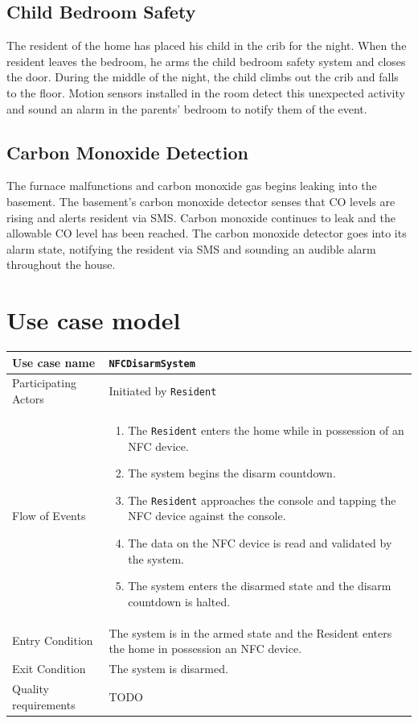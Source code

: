 \documentclass{report}
\begin{document}
\subsection*{Child Bedroom Safety}

The resident of the home has placed his child in the crib for the night. When
the resident leaves the bedroom, he arms the child bedroom safety system and
closes the door. During the middle of the night, the child climbs out the crib
and falls to the floor. Motion sensors installed in the room detect this
unexpected activity and sound an alarm in the parents' bedroom to notify them
of the event.

\subsection*{Carbon Monoxide Detection}

The furnace malfunctions and carbon monoxide gas begins leaking into the basement.
The basement's carbon monoxide detector senses that CO levels are rising and alerts
resident via SMS. Carbon monoxide continues to leak and the allowable CO level has
been reached. The carbon monoxide detector goes into its alarm state, notifying the
resident via SMS and sounding an audible alarm throughout the house.

\section{Use case model}

\begin{tabular}{| l | p{7cm} |}
\hline
Use case name & \texttt{NFCDisarmSystem} \\ \hline
Participating Actors & Initiated by \texttt{Resident} \\ \hline
Flow of Events & 

\begin{enumerate}
 \item The \texttt{Resident} enters the home while in possession of an NFC 
        device.
 \item The system begins the disarm countdown.
 \item The \texttt{Resident} approaches the console and tapping the NFC device
       against the console.
 \item The data on the NFC device is read and validated by the system.
 \item The system enters the disarmed state and the disarm countdown is halted.
\end{enumerate}

\\ \hline

Entry Condition & The system is in the armed state and the Resident enters the
home in possession an NFC device. \\ \hline

Exit Condition & The system is disarmed. \\ \hline
Quality requirements & TODO \\ \hline

\hline
\end{tabular}
\end{document}
